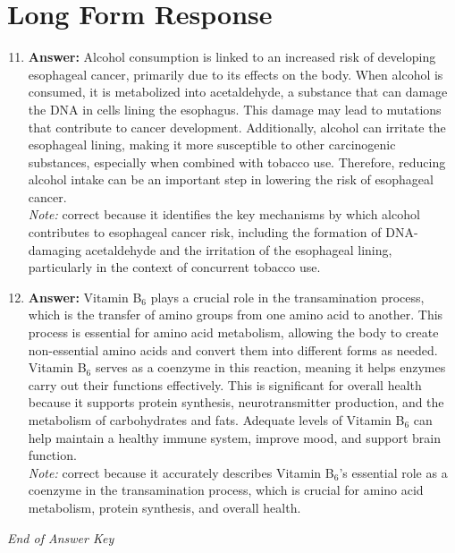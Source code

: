 \documentclass[12pt]{article}
\begin{document}
\section*{Long Form Response}
\begin{enumerate}[label=\arabic*.]
\setcounter{enumi}{10}
\item \textbf{Answer:} Alcohol consumption is linked to an increased risk of developing esophageal cancer, primarily due to its effects on the body. When alcohol is consumed, it is metabolized into acetaldehyde, a substance that can damage the DNA in cells lining the esophagus. This damage may lead to mutations that contribute to cancer development. Additionally, alcohol can irritate the esophageal lining, making it more susceptible to other carcinogenic substances, especially when combined with tobacco use. Therefore, reducing alcohol intake can be an important step in lowering the risk of esophageal cancer.
\\ \textit{Note:} correct because it identifies the key mechanisms by which alcohol contributes to esophageal cancer risk, including the formation of DNA-damaging acetaldehyde and the irritation of the esophageal lining, particularly in the context of concurrent tobacco use.
\item \textbf{Answer:} Vitamin B$_{6}$ plays a crucial role in the transamination process, which is the transfer of amino groups from one amino acid to another. This process is essential for amino acid metabolism, allowing the body to create non-essential amino acids and convert them into different forms as needed. Vitamin B$_{6}$ serves as a coenzyme in this reaction, meaning it helps enzymes carry out their functions effectively. This is significant for overall health because it supports protein synthesis, neurotransmitter production, and the metabolism of carbohydrates and fats. Adequate levels of Vitamin B$_{6}$ can help maintain a healthy immune system, improve mood, and support brain function.
\\ \textit{Note:} correct because it accurately describes Vitamin B$_{6}$'s essential role as a coenzyme in the transamination process, which is crucial for amino acid metabolism, protein synthesis, and overall health.
\end{enumerate}

\vfill
\noindent\textit{End of Answer Key}
\end{document}
